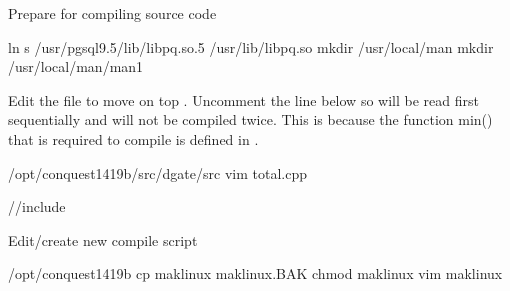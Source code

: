 \documentclass[letterpaper,10pt,english]{sphinxmanual}
\begin{document}
Prepare for compiling source code

%
\begin{sphinxVerbatim}[commandchars=\\\{\}]
ln \PYGZhy{}s /usr/pgsql\PYGZhy{}9.5/lib/libpq.so.5 /usr/lib/libpq.so
mkdir /usr/local/man
mkdir /usr/local/man/man1
\end{sphinxVerbatim}

Edit the  file to move  on top . Uncomment the line below  so  will be read first sequentially and will not be compiled twice. This is because the function min() that is required to compile  is defined in .

%
\begin{sphinxVerbatim}[commandchars=\\\{\}]
 /opt/conquest\PYGZhy{}14\PYGZhy{}19b/src/dgate/src
vim total.cpp
\end{sphinxVerbatim}

%
\begin{sphinxVerbatim}[commandchars=\\\{\}]

//\PYGZsh{}include 
\end{sphinxVerbatim}

Edit/create new compile script

%
\begin{sphinxVerbatim}[commandchars=\\\{\}]
 /opt/conquest\PYGZhy{}14\PYGZhy{}19b
cp maklinux maklinux.BAK
chmod  maklinux
vim maklinux
\end{sphinxVerbatim}
\end{document}
